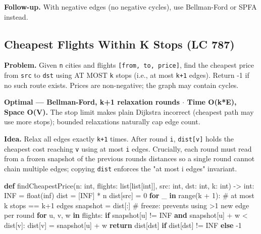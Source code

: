 \documentclass[11pt]{article}
\newenvironment{Shaded}{\begin{snugshade}}{\end{snugshade}}
\newcommand{\BuiltInTok}[1]{\textcolor[rgb]{0.50,0.55,0.55}{#1}}
\newcommand{\CommentTok}[1]{\textcolor[rgb]{0.48,0.49,0.49}{#1}}
\newcommand{\ControlFlowTok}[1]{\textcolor[rgb]{0.99,0.74,0.29}{\textbf{#1}}}
\newcommand{\DecValTok}[1]{\textcolor[rgb]{0.96,0.45,0.00}{#1}}
\newcommand{\KeywordTok}[1]{\textcolor[rgb]{0.81,0.81,0.76}{\textbf{#1}}}
\newcommand{\NormalTok}[1]{\textcolor[rgb]{0.81,0.81,0.76}{#1}}
\newcommand{\OperatorTok}[1]{\textcolor[rgb]{0.81,0.81,0.76}{#1}}
\newcommand{\StringTok}[1]{\textcolor[rgb]{0.96,0.31,0.31}{#1}}
\begin{document}
\textbf{Follow-up.} With negative edges (no negative cycles), use Bellman-Ford or SPFA instead.

\subsection{Cheapest Flights Within K Stops (LC 787)}\label{cheapest-flights-within-k-stops-lc-787}

\textbf{Problem.} Given \texttt{n} cities and flights \texttt{{[}from,\ to,\ price{]}}, find the cheapest price from \texttt{src} to \texttt{dst} using AT MOST \texttt{k} stops (i.e., at most \texttt{k+1} edges). Return -1 if no such route exists. Prices are non-negative; the graph may contain cycles.

\textbf{Optimal --- Bellman-Ford, k+1 relaxation rounds \(\cdot\) Time O(k*E), Space O(V).} The stop limit makes plain Dijkstra incorrect (cheapest path may use more stops); bounded relaxations naturally cap edge count.

\textbf{Idea.} Relax all edges exactly \texttt{k+1} times. After round \texttt{i}, \texttt{dist{[}v{]}} holds the cheapest cost reaching \texttt{v} using at most \texttt{i} edges. Crucially, each round must read from a frozen snapshot of the previous round\textquotesingle s distances so a single round cannot chain multiple edges; copying \texttt{dist} enforces the "at most i edges" invariant.


\begin{Shaded}
\begin{Highlighting}[]
\KeywordTok{def}\NormalTok{ findCheapestPrice(n: }\BuiltInTok{int}\NormalTok{, flights: }\BuiltInTok{list}\NormalTok{[}\BuiltInTok{list}\NormalTok{[}\BuiltInTok{int}\NormalTok{]], src: }\BuiltInTok{int}\NormalTok{,}
\NormalTok{                      dst: }\BuiltInTok{int}\NormalTok{, k: }\BuiltInTok{int}\NormalTok{) }\OperatorTok{{-}\textgreater{}} \BuiltInTok{int}\NormalTok{:}
\NormalTok{    INF }\OperatorTok{=} \BuiltInTok{float}\NormalTok{(}\StringTok{\textquotesingle{}inf\textquotesingle{}}\NormalTok{)}
\NormalTok{    dist }\OperatorTok{=}\NormalTok{ [INF] }\OperatorTok{*}\NormalTok{ n}
\NormalTok{    dist[src] }\OperatorTok{=} \DecValTok{0}
    \ControlFlowTok{for}\NormalTok{ \_ }\KeywordTok{in} \BuiltInTok{range}\NormalTok{(k }\OperatorTok{+} \DecValTok{1}\NormalTok{):           }\CommentTok{\# at most k stops == k+1 edges}
\NormalTok{        snapshot }\OperatorTok{=}\NormalTok{ dist[:]            }\CommentTok{\# freeze: prevents using \textgreater{}1 new edge per round}
        \ControlFlowTok{for}\NormalTok{ u, v, w }\KeywordTok{in}\NormalTok{ flights:}
            \ControlFlowTok{if}\NormalTok{ snapshot[u] }\OperatorTok{!=}\NormalTok{ INF }\KeywordTok{and}\NormalTok{ snapshot[u] }\OperatorTok{+}\NormalTok{ w }\OperatorTok{\textless{}}\NormalTok{ dist[v]:}
\NormalTok{                dist[v] }\OperatorTok{=}\NormalTok{ snapshot[u] }\OperatorTok{+}\NormalTok{ w}
    \ControlFlowTok{return}\NormalTok{ dist[dst] }\ControlFlowTok{if}\NormalTok{ dist[dst] }\OperatorTok{!=}\NormalTok{ INF }\ControlFlowTok{else} \OperatorTok{{-}}\DecValTok{1}
\end{Highlighting}
\end{Shaded}
\end{document}
